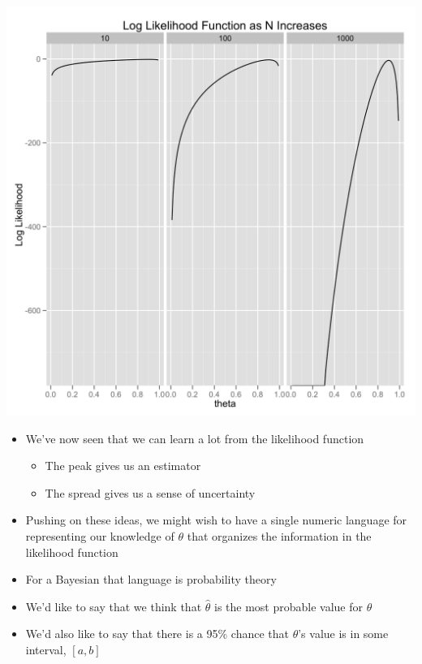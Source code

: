 \documentclass{beamer}
\begin{document}
\frame
{
  \begin{center}
    \includegraphics[scale = 0.1]{fisher_information.png}
  \end{center}
}


\frame
{
  \begin{itemize}
    \item{We've now seen that we can learn a lot from the likelihood function}
    \begin{itemize}
      \item{The peak gives us an estimator}
      \item{The spread gives us a sense of uncertainty}
    \end{itemize}
  \end{itemize}
}

\frame
{
  \begin{itemize}
    \item{Pushing on these ideas, we might wish to have a single numeric language for representing our knowledge of $\theta$ that organizes the information in the likelihood function}
    \item{For a Bayesian that language is probability theory}
    \item{We'd like to say that we think that $\hat{\theta}$ is the most probable value for $\theta$}
    \item{We'd also like to say that there is a 95\% chance that $\theta$'s value is in some interval, $[a, b]$}
  \end{itemize}
}
\end{document}
